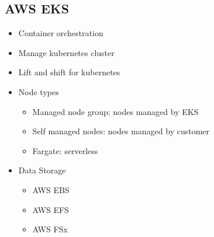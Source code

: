 \documentclass[../../main.tex]{subfiles}
\begin{document}
\subsection{AWS EKS}
\begin{itemize}
    \item Container orchestration
    \item Manage kubernetes cluster
    \item Lift and shift for kubernetes
    \item Node types
    \begin{itemize}
        \item Managed node group: nodes managed by EKS
        \item Self managed nodes: nodes managed by customer
        \item Fargate: serverless
    \end{itemize}
    \item Data Storage
    \begin{itemize}
        \item AWS EBS
        \item AWS EFS
        \item AWS FSx
    \end{itemize}
\end{itemize}
\end{document}
